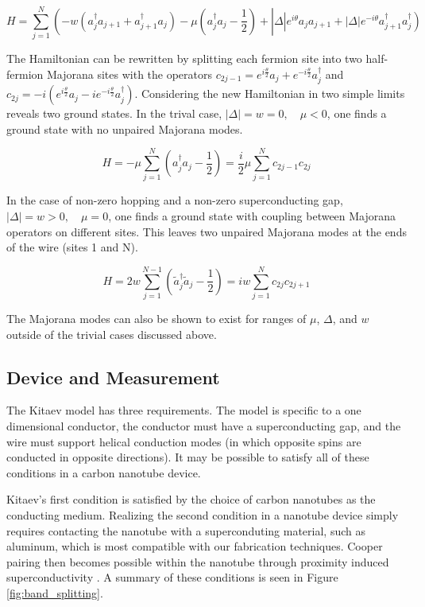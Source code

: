 \begin{equation}
	H = \sum_{j=1}^{N}\left(-w\left(a_j^\dagger a_{j+1}+a_{j+1}^\dagger a_j\right)-\mu\left( a_j^\dagger a_{j} -\frac{1}{2}\right) + \right| \Delta \left| e^{i\theta} a_ja_{j+1} + \left|\Delta\right|e^{-i\theta} a_{j+1}^\dagger a_j^\dagger\right)
\end{equation}

The Hamiltonian can be rewritten by splitting each fermion site into two half-fermion Majorana sites with the operators $c_{2j-1}=e^{i\frac{\theta}{2}}a_j+e^{-i\frac{\theta}{2}}a_j^\dagger$ and $c_{2j}=-i\left(e^{i\frac{\theta}{2}}a_j-ie^{-i\frac{\theta}{2}}a_j^\dagger\right)$.  Considering the new Hamiltonian in two simple limits reveals two ground states. In the trival case, $\left|\Delta\right| = w = 0,\quad \mu < 0$, one finds a ground state with no unpaired Majorana modes.

\begin{equation}
	H = -\mu\sum_{j=1}^{N}\left(a_j^\dagger a_j - \frac{1}{2}\right) = \frac{i}{2}\mu \sum_{j=1}^{N} c_{2j-1}c_{2j}
\end{equation}

In the case of non-zero hopping and a non-zero superconducting gap, $\left|\Delta\right| = w > 0,\quad \mu = 0$, one finds a ground state with coupling between Majorana operators on different sites.  This leaves two unpaired Majorana modes at the ends of the wire (sites 1 and N).  

\begin{equation}
	H = 2w\sum_{j=1}^{N-1}\left(\tilde{a}_j^\dagger \tilde{a}_j - \frac{1}{2}\right) = iw\sum_{j=1}^{N} c_{2j}c_{2j+1}
\end{equation}

The Majorana modes can also be shown to exist for ranges of $\mu$, $\Delta$, and $w$ outside of the trivial cases discussed above.  

\subsection{Device and Measurement}

The Kitaev model has three requirements.  The model is specific to a one dimensional conductor, the conductor must have a superconducting gap, and the wire must support helical conduction modes (in which opposite spins are conducted in opposite directions).  It may be possible to satisfy all of these conditions in a carbon nanotube device.

Kitaev's first condition is satisfied by the choice of carbon nanotubes as the conducting medium.  Realizing the second condition in a nanotube device simply requires contacting the nanotube with a superconduting material, such as aluminum, which is most compatible with our fabrication techniques.  Cooper pairing then becomes possible within the nanotube through proximity induced superconductivity \cite{Kasumov1999, JarilloHerrero2006}. A summary of these conditions is seen in Figure \ref{fig:band_splitting}. 

